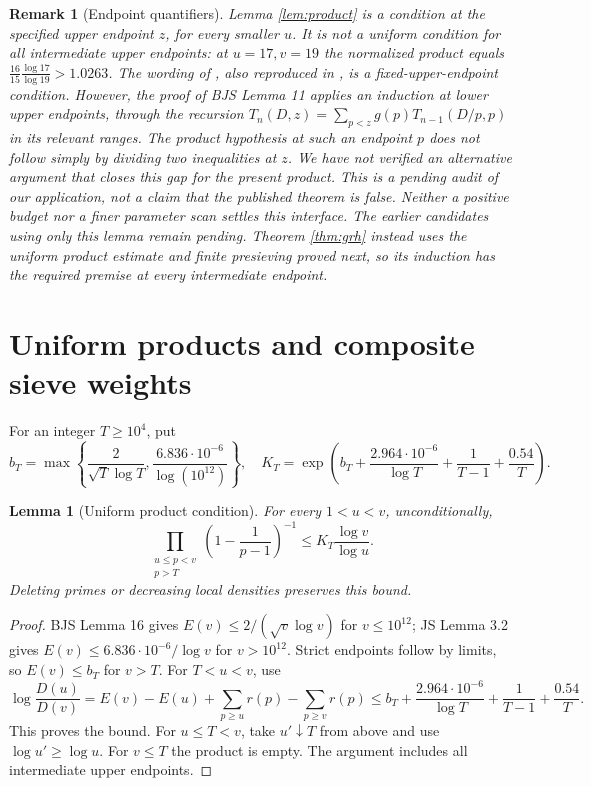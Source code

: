 \documentclass[11pt]{article}
\newtheorem{lemma}[theorem]{Lemma}
\newtheorem{remark}[theorem]{Remark}
\begin{document}
\begin{remark}[Endpoint quantifiers]\label{rem:endpoints}
Lemma \ref{lem:product} is a condition at the specified upper endpoint
$z$, for every smaller $u$. It is not a uniform condition for all
intermediate upper endpoints: at $u=17,v=19$ the normalized product
equals
$\frac{16}{15}\frac{\log17}{\log19}>1.0263$.
The wording of \cite[Theorem 6]{BJS}, also reproduced in
\cite[Lemma 2.2]{DJ}, is a fixed-upper-endpoint condition. However,
the proof of BJS Lemma 11 applies an induction at lower upper endpoints,
through the recursion $T_n(D,z)=\sum_{p<z}g(p)T_{n-1}(D/p,p)$
in its relevant ranges. The product hypothesis at such an endpoint $p$
does not follow simply by dividing two inequalities at $z$.
We have not verified an alternative argument that closes this gap for
the present product. This is a pending audit of \emph{our application},
not a claim that the published theorem is false.
Neither a positive budget nor a finer parameter scan settles this
interface. The earlier candidates using only this lemma remain pending.
Theorem \ref{thm:grh} instead uses the uniform product estimate and
finite presieving proved next, so its induction has the required
premise at every intermediate endpoint.
\end{remark}

\section{Uniform products and composite sieve weights}
For an integer $T\ge10^4$, put
\[
b_T=\max\left\{\frac2{\sqrt T\log T},
\frac{6.836\cdot10^{-6}}{\log(10^{12})}\right\},\quad
K_T=\exp\left(b_T+\frac{2.964\cdot10^{-6}}{\log T}
+\frac1{T-1}+\frac{0.54}{T}\right).
\]
\begin{lemma}[Uniform product condition]\label{lem:uniform}
For every $1<u<v$, unconditionally,
\[
\prod_{\substack{u\le p<v\\p>T}}
\left(1-\frac1{p-1}\right)^{-1}
\le K_T\frac{\log v}{\log u}.
\]
Deleting primes or decreasing local densities preserves this bound.
\end{lemma}
\begin{proof}
BJS Lemma 16 gives $E(v)\le2/(\sqrt v\log v)$ for $v\le10^{12}$;
JS Lemma 3.2 gives $E(v)\le6.836\cdot10^{-6}/\log v$ for
$v>10^{12}$. Strict endpoints follow by limits, so $E(v)\le b_T$
for $v>T$. For $T<u<v$, use
\[
\log\frac{D(u)}{D(v)}
=E(v)-E(u)+\sum_{p\ge u}r(p)-\sum_{p\ge v}r(p)
\le b_T+\frac{2.964\cdot10^{-6}}{\log T}
+\frac1{T-1}+\frac{0.54}{T}.
\]
This proves the bound. For $u\le T<v$, take $u'\downarrow T$
from above and use $\log u'\ge\log u$. For $v\le T$ the product
is empty. The argument includes all intermediate upper endpoints.
\end{proof}
\end{document}

